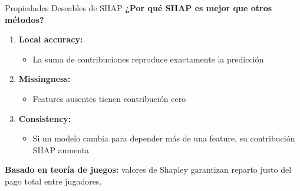 \documentclass[aspectratio=169]{beamer}
\begin{document}
\begin{frame}{Propiedades Deseables de SHAP}
\textbf{¿Por qué SHAP es mejor que otros métodos?}

\vspace{0.3cm}

\begin{enumerate}
\item \textbf{Local accuracy:} 
\begin{itemize}
\item La suma de contribuciones reproduce exactamente la predicción
\end{itemize}

\vspace{0.2cm}

\item \textbf{Missingness:}
\begin{itemize}
\item Features ausentes tienen contribución cero
\end{itemize}

\vspace{0.2cm}

\item \textbf{Consistency:}
\begin{itemize}
\item Si un modelo cambia para depender más de una feature, su contribución SHAP aumenta
\end{itemize}
\end{enumerate}

\vspace{0.3cm}

\textbf{Basado en teoría de juegos:} valores de Shapley garantizan reparto justo del pago total entre jugadores.
\end{frame}
\end{document}
